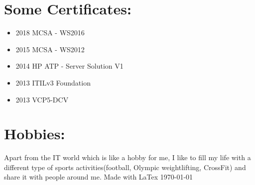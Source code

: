 \documentclass[a4paper,10pt]{article}
\begin{document}
\section*{Some Certificates:}
\begin{itemize}
  \item 2018 MCSA - WS2016
  \item 2015 MCSA - WS2012
  \item 2014 HP ATP - Server Solution V1
  \item 2013 ITILv3 Foundation 
  \item 2013 VCP5-DCV
\end{itemize}
\section*{Hobbies:}
\textnormal{Apart from the IT world which is like a hobby for me, I like to fill my life with a different type of
sports activities(football, Olympic weightlifting, CrossFit) and share it with people around me.}
\mbox{}
\vfill
\textcopyright Made with LaTex \today
\end{document}
